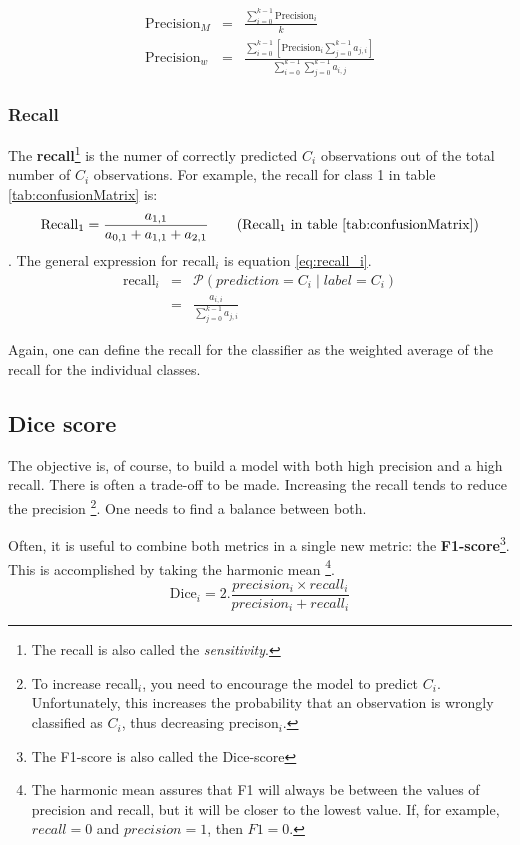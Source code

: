 \begin{eqnarray}
    \text{Precision}_M &=& \frac{\sum_{i=0}^{k-1} \text{Precision}_i}{k}  \\
    \text{Precision}_w &=& \frac{\sum_{i=0}^{k-1} \left[ \text{Precision}_i \sum_{j=0}^{k-1} a_{j,i} \right] }{\sum_{i=0}^{k-1} \sum_{j=0}^{k-1} a_{i,j} }  
\end{eqnarray}


\subsubsection{Recall}

The \textbf{recall}\footnote{The recall is also called the \textit{sensitivity}.} is the numer of correctly predicted $C_i$ observations out of the total number of $C_i$ observations.
For example, the recall for class 1 in table \ref{tab:confusionMatrix} is:
\begin{equation}
    \text{Recall}_1 = \frac{a_{1,1}}{a_{0,1} + a_{1,1} + a_{2, 1}} \tag{Recall$_1$ in table \ref{tab:confusionMatrix}}
\end{equation}.
The general expression for recall$_i$ is equation \ref{eq:recall_i}.
\begin{eqnarray}
    \text{recall}_i &=& \mathcal{P} \left( prediction = C_i \mid label = C_i \right) \\
    &=& \frac{a_{i, i}}{\sum_{j=0}^{k-1} a_{j, i}} \label{eq:recall_i}
\end{eqnarray}

Again, one can define the recall for the classifier as the weighted average of the recall for the individual classes.

\subsection{Dice score\label{sec:dice}}

The objective is, of course, to build a model with both high precision and a high recall.
There is often a trade-off to be made. 
Increasing the recall tends to reduce the precision
\footnote{To increase recall$_i$, you need to encourage the model to predict $C_i$. Unfortunately, this increases the probability that an observation is wrongly classified as $C_i$, thus decreasing precison$_i$.}.
One needs to find a balance between both.

Often, it is useful to combine both metrics in a single new metric: the \textbf{F1-score}\footnote{The F1-score is also called the Dice-score}. This is accomplished by taking the harmonic mean
\footnote{The harmonic mean assures that F1 will always be between the values of precision and recall, but it will be closer to the lowest value. If, for example, $recall=0$ and $precision=1$, then $F1=0$.}.
\begin{equation}
    \text{Dice}_i = 2 . \frac{precision_i \times recall_i }{precision_i + recall_i }
\end{equation}

